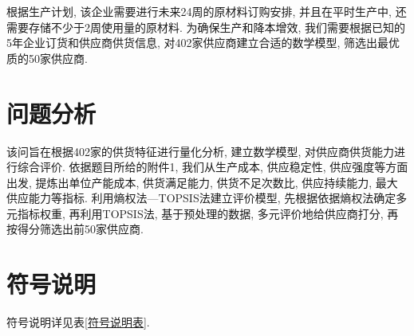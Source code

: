 \documentclass[11pt, fontset = windows]{article}
\begin{document}
根据生产计划, 该企业需要进行未来24周的原材料订购安排, 并且在平时生产中, 还需要存储不少于2周使用量的原材料. 为确保生产和降本增效, 我们需要根据已知的5年企业订货和供应商供货信息, 对402家供应商建立合适的数学模型, 筛选出最优质的50家供应商.

\section[]{问题分析}

该问旨在根据402家的供货特征进行量化分析, 建立数学模型, 对供应商供货能力进行综合评价.
依据题目所给的附件1, 我们从生产成本, 供应稳定性, 供应强度等方面出发, 提炼出单位产能成本, 供货满足能力, 供货不足次数比, 供应持续能力, 最大供应能力等指标.
利用熵权法—TOPSIS法建立评价模型, 先根据依据熵权法确定多元指标权重, 再利用TOPSIS法, 基于预处理的数据, 多元评价地给供应商打分, 再按得分筛选出前50家供应商.

\section[]{符号说明}

符号说明详见表\ref{符号说明表}.
\end{document}
